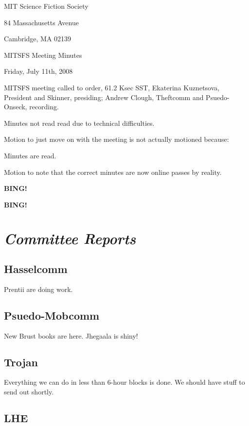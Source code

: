 \documentclass[10pt]{article}
\newcommand{\bing}{{\bf BING!} }
\newcommand{\goto}[1]{\bing \vskip 12pt \section*{{\em{#1}}}}
\begin{document}
\begin{center}

MIT Science Fiction Society

84 Massachusetts Avenue

Cambridge, MA 02139

\vspace{12pt}

MITSFS Meeting Minutes

Friday, July 11th, 2008

\end{center}

\vspace{18pt}

\setlength{\parskip}{6pt}

\noindent
MITSFS meeting called to order, 61.2 Ksec SST,
Ekaterina Kuznetsova, President and Skinner, presiding; Andrew Clough, Theftcomm and Psuedo-Onseck, recording.

Minutes not read read due to technical difficulties.

Motion to just move on with the meeting is not actually motioned because:

Minutes are read.

Motion to note that the correct minutes are now online passes by reality.

\bing

\goto{Committee Reports}

\subsection*{Hasselcomm}

Prentii are doing work.

\subsection*{Psuedo-Mobcomm}

New Brust books are here.  Jhegaala is shiny!

\subsection*{Trojan}

Everything we can do in less than 6-hour blocks is done.  We should
have stuff to send out shortly.

\subsection*{LHE}
\end{document}
